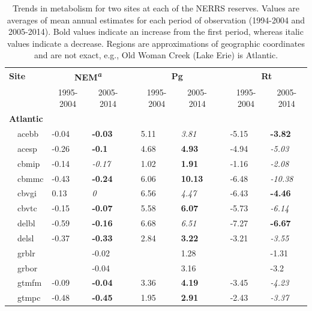 \documentclass[10pt,letterpaper]{article}\usepackage[]{graphicx}\usepackage[]{color}
\begin{document}
\begin{table}[!tbp]
{\footnotesize
\caption{Trends in metabolism for two sites at each of the \ac{NERRS} reserves.  Values are averages of mean annual estimates for each period of observation (1994-2004 and 2005-2014).  Bold values indicate an increase from the first period, whereas italic values indicate a decrease.  Regions are approximations of geographic coordinates and are not exact, e.g., Old Woman Creek (Lake Erie) is Atlantic.\label{tab:metab_tab}} 
\begin{center}
\begin{tabular}{lllcllcll}
\hline\hline
\multicolumn{1}{l}{\bfseries Site}&\multicolumn{2}{c}{\bfseries NEM\textsuperscript{{\it a}}}&\multicolumn{1}{c}{\bfseries }&\multicolumn{2}{c}{\bfseries Pg}&\multicolumn{1}{c}{\bfseries }&\multicolumn{2}{c}{\bfseries Rt}\tabularnewline
\cline{2-3} \cline{5-6} \cline{8-9}
\multicolumn{1}{l}{}&\multicolumn{1}{c}{1995-2004}&\multicolumn{1}{c}{2005-2014}&\multicolumn{1}{c}{}&\multicolumn{1}{c}{1995-2004}&\multicolumn{1}{c}{2005-2014}&\multicolumn{1}{c}{}&\multicolumn{1}{c}{1995-2004}&\multicolumn{1}{c}{2005-2014}\tabularnewline
\hline
{\bfseries Atlantic}&&&&&&&&\tabularnewline
~~acebb&-0.04&{\bf -0.03}&&5.11&{\it 3.81}&&-5.15&{\bf -3.82}\tabularnewline
~~acesp&-0.26&{\bf -0.1}&&4.68&{\bf 4.93}&&-4.94&{\it -5.03}\tabularnewline
~~cbmip&-0.14&{\it -0.17}&&1.02&{\bf 1.91}&&-1.16&{\it -2.08}\tabularnewline
~~cbmmc&-0.43&{\bf -0.24}&&6.06&{\bf 10.13}&&-6.48&{\it -10.38}\tabularnewline
~~cbvgi&0.13&{\it 0}&&6.56&{\it 4.47}&&-6.43&{\bf -4.46}\tabularnewline
~~cbvtc&-0.15&{\bf -0.07}&&5.58&{\bf 6.07}&&-5.73&{\it -6.14}\tabularnewline
~~delbl&-0.59&{\bf -0.16}&&6.68&{\it 6.51}&&-7.27&{\bf -6.67}\tabularnewline
~~delsl&-0.37&{\bf -0.33}&&2.84&{\bf 3.22}&&-3.21&{\it -3.55}\tabularnewline
~~grblr&&-0.02&&&1.28&&&-1.31\tabularnewline
~~grbor&&-0.04&&&3.16&&&-3.2\tabularnewline
~~gtmfm&-0.09&{\bf -0.04}&&3.36&{\bf 4.19}&&-3.45&{\it -4.23}\tabularnewline
~~gtmpc&-0.48&{\bf -0.45}&&1.95&{\bf 2.91}&&-2.43&{\it -3.37}\tabularnewline

\end{tabular}
\end{center}}
\end{table}
\end{document}
